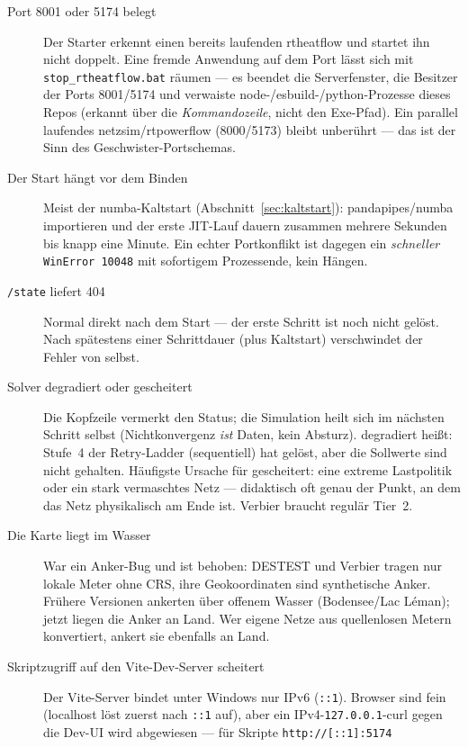 \documentclass[11pt,a4paper,parskip=half]{scrreprt}
\newcommand{\api}[1]{\texttt{#1}}
\begin{document}
\begin{description}
  \item[Port 8001 oder 5174 belegt] Der Starter erkennt einen bereits laufenden
    rtheatflow und startet ihn nicht doppelt. Eine fremde Anwendung auf dem Port
    lässt sich mit \texttt{stop\_rtheatflow.bat} räumen --- es beendet die
    Serverfenster, die Besitzer der Ports 8001/5174 und verwaiste
    node-/esbuild-/python-Prozesse dieses Repos (erkannt über die
    \emph{Kommandozeile}, nicht den Exe-Pfad). Ein parallel laufendes
    netzsim/rtpowerflow (8000/5173) bleibt unberührt --- das ist der Sinn des
    Geschwister-Portschemas.
  \item[Der Start hängt vor dem Binden] Meist der numba-Kaltstart
    (Abschnitt~\ref{sec:kaltstart}): pandapipes/numba importieren und der erste
    JIT-Lauf dauern zusammen mehrere Sekunden bis knapp eine Minute. Ein echter
    Portkonflikt ist dagegen ein \emph{schneller} \texttt{WinError 10048} mit
    sofortigem Prozessende, kein Hängen.
  \item[\api{/state} liefert 404] Normal direkt nach dem Start --- der erste
    Schritt ist noch nicht gelöst. Nach spätestens einer Schrittdauer (plus
    Kaltstart) verschwindet der Fehler von selbst.
  \item[Solver \glqq degradiert\grqq{} oder \glqq gescheitert\grqq] Die Kopfzeile
    vermerkt den Status; die Simulation heilt sich im nächsten Schritt selbst
    (Nichtkonvergenz \emph{ist} Daten, kein Absturz). \glqq degradiert\grqq{}
    heißt: Stufe~4 der Retry-Ladder (sequentiell) hat gelöst, aber die Sollwerte
    sind nicht gehalten. Häufigste Ursache für \glqq gescheitert\grqq: eine
    extreme Lastpolitik oder ein stark vermaschtes Netz --- didaktisch oft genau
    der Punkt, an dem das Netz physikalisch am Ende ist. Verbier braucht
    regulär Tier~2.
  \item[Die Karte liegt im Wasser] War ein Anker-Bug und ist behoben:
    DESTEST und Verbier tragen nur lokale Meter ohne CRS, ihre Geokoordinaten
    sind synthetische Anker. Frühere Versionen ankerten über offenem Wasser
    (Bodensee/Lac Léman); jetzt liegen die Anker an Land. Wer eigene Netze aus
    quellenlosen Metern konvertiert, ankert sie ebenfalls an Land.
  \item[Skriptzugriff auf den Vite-Dev-Server scheitert] Der Vite-Server bindet
    unter Windows nur IPv6 (\texttt{::1}). Browser sind fein (localhost löst
    zuerst nach \texttt{::1} auf), aber ein IPv4-\texttt{127.0.0.1}-curl gegen
    die Dev-UI wird abgewiesen --- für Skripte \texttt{http://[::1]:5174}

\end{description}
\end{document}
